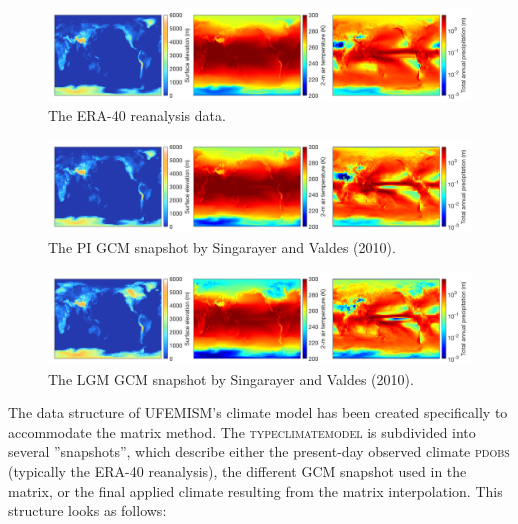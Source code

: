 \documentclass{article}
\begin{document}
\begin{figure}[h!] \label{fig:climate_ERA40}
  \includegraphics[width=0.95\linewidth]{Fig_climate_ERA40.png}
  \caption{The ERA-40 reanalysis data.}
\end{figure}

\begin{figure}[h!] \label{fig:climate_GCM_PI}
  \includegraphics[width=0.95\linewidth]{Fig_climate_GCM_PI.png}
  \caption{The PI GCM snapshot by Singarayer and Valdes (2010).}
\end{figure}

\begin{figure}[h!] \label{fig:climate_GCM_LGM}
  \includegraphics[width=0.95\linewidth]{Fig_climate_GCM_LGM.png}
  \caption{The LGM GCM snapshot by Singarayer and Valdes (2010).}
\end{figure}

The data structure of UFEMISM's climate model has been created specifically to accommodate the matrix method. The \textsc{type\textunderscore climate\textunderscore model} is subdivided into several ''snapshots'', which describe either the present-day observed climate \textsc{pd\textunderscore obs} (typically the ERA-40 reanalysis), the different GCM snapshot used in the matrix, or the final applied climate resulting from the matrix interpolation. This structure looks as follows:
\end{document}
